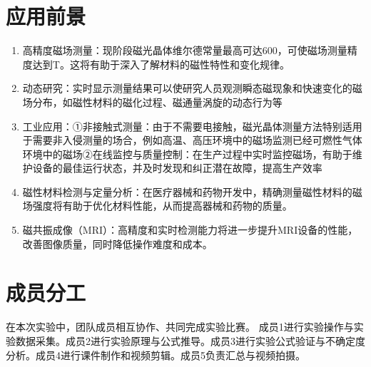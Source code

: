\documentclass[12pt]{ctexart}
\numberwithin{equation}{section} %
\begin{document}
\section{应用前景}
\begin{enumerate}
    \item 高精度磁场测量：现阶段磁光晶体维尔德常量最高可达600，可使磁场测量精度达到T。这将有助于深入了解材料的磁性特性和变化规律。
\item 动态研究：实时显示测量结果可以使研究人员观测瞬态磁现象和快速变化的磁场分布，如磁性材料的磁化过程、磁通量涡旋的动态行为等
\item 工业应用：①非接触式测量：由于不需要\cite{郭永康1992光学教程}电接触，磁光晶体测量方法特别适用于需要非入侵测量的场合，例如高温、高压环境中的磁场监测已经可燃性气体环境中的磁场②在线监控与质量控制：在生产过程中实时监控磁场，有助于维护设备的最佳运行状态，并及时发现和纠正潜在故障，提高生产效率
\item 磁性材料检测与定量分析：在医疗器械和药物开发中，精确测量磁性材料的磁场强度将有助于优化材料性能，从而提高器械和药物的质量。
\item 磁共振成像（MRI）：高精度和实时检测能力将进一步提升MRI设备的性能，改善图像质量，同时降低操作难度和成本。
\end{enumerate}
\section{成员分工}
在本次实验中，团队成员相互协作、共同完成实验比赛。
成员1进行实验操作与实验数据采集。成员2进行实验原理与公式推导。成员3进行实验公式验证与不确定度分析。成员4进行课件制作和视频剪辑。成员5负责汇总与视频拍摄。

\end{document}
